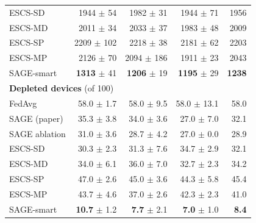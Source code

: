 \documentclass[11pt,a4paper]{article}
\begin{document}
\begin{table}[H]
\begin{tabular}{lrrrr}
\quad ESCS-SD         & 1944 $\pm$ 54  & 1982 $\pm$ 31  & 1944 $\pm$ 71 & 1956 \\
\quad ESCS-MD         & 2011 $\pm$ 34  & 2033 $\pm$ 37  & 1983 $\pm$ 48 & 2009 \\
\quad ESCS-SP         & 2209 $\pm$ 102 & 2218 $\pm$ 38  & 2181 $\pm$ 62 & 2203 \\
\quad ESCS-MP         & 2126 $\pm$ 70  & 2094 $\pm$ 186 & 1911 $\pm$ 23 & 2043 \\
\quad SAGE-smart      & \textbf{1313} $\pm$ 41 & \textbf{1206} $\pm$ 19 & \textbf{1195} $\pm$ 29 & \textbf{1238} \\
\midrule
\multicolumn{5}{l}{\textbf{Depleted devices} (of 100)} \\
\quad FedAvg          & 58.0 $\pm$ 1.7 & 58.0 $\pm$ 9.5 & 58.0 $\pm$ 13.1 & 58.0 \\
\quad SAGE (paper)    & 35.3 $\pm$ 3.8 & 34.0 $\pm$ 3.6 & 27.0 $\pm$ 7.0  & 32.1 \\
\quad SAGE ablation   & 31.0 $\pm$ 3.6 & 28.7 $\pm$ 4.2 & 27.0 $\pm$ 0.0  & 28.9 \\
\quad ESCS-SD         & 30.3 $\pm$ 2.3 & 31.3 $\pm$ 7.6 & 34.7 $\pm$ 2.9  & 32.1 \\
\quad ESCS-MD         & 34.0 $\pm$ 6.1 & 36.0 $\pm$ 7.0 & 32.7 $\pm$ 2.3  & 34.2 \\
\quad ESCS-SP         & 47.0 $\pm$ 2.6 & 45.0 $\pm$ 3.6 & 44.3 $\pm$ 5.8  & 45.4 \\
\quad ESCS-MP         & 43.7 $\pm$ 4.6 & 37.0 $\pm$ 2.6 & 42.3 $\pm$ 2.3  & 41.0 \\
\quad SAGE-smart      & \textbf{10.7} $\pm$ 1.2 & \textbf{7.7} $\pm$ 2.1 & \textbf{7.0} $\pm$ 1.0 & \textbf{8.4} \\
\bottomrule
\end{tabular}
\end{table}
\end{document}
